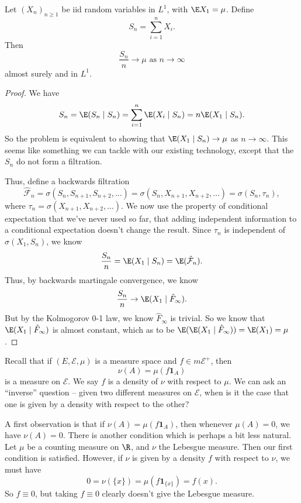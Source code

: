 \documentclass[a4paper]{article}
\begin{document}
\begin{thm}
  Let $(X_n)_{n \geq 1}$ be iid random variables in $L^1$, with $\E X_1 = \mu$. Define
  \[
    S_n = \sum_{i = 1}^n X_i.
  \]
  Then
  \[
    \frac{S_n}{n} \to \mu\text{ as }n \to \infty
  \]
  almost surely and in $L^1$.
\end{thm}

\begin{proof}
  We have
  \[
    S_n = \E(S_n \mid S_n) = \sum_{i = 1}^n \E(X_i \mid S_n) = n \E(X_1 \mid S_n).
  \]
  So the problem is equivalent to showing that $\E(X_1 \mid S_n) \to \mu$ as $n \to \infty$. This seems like something we can tackle with our existing technology, except that the $S_n$ do not form a filtration.

  Thus, define a backwards filtration
  \[
    \hat{\mathcal{F}}_n = \sigma(S_n, S_{n + 1}, S_{n + 2}, \ldots) = \sigma(S_n, X_{n + 1}, X_{n + 2}, \ldots) = \sigma(S_n, \tau_n),
  \]
  where $\tau_n = \sigma(X_{n + 1}, X_{n + 2}, \ldots)$. We now use the property of conditional expectation that we've never used so far, that adding independent information to a conditional expectation doesn't change the result. Since $\tau_n$ is independent of $\sigma(X_1, S_n)$, we know
  \[
    \frac{S_n}{n} = \E(X_1 \mid S_n) = \E(\hat{\mathcal{F}}_n).
  \]
  Thus, by backwards martingale convergence, we know
  \[
    \frac{S_n}{n} \to \E(X_1 \mid \hat{F}_{\infty}).
  \]
  But by the Kolmogorov 0-1 law, we know $\hat{F}_{\infty}$ is trivial. So we know that $\E(X_1 \mid \hat{F}_{\infty})$ is almost constant, which as to be $\E(\E(X_1 \mid \hat{F}_{\infty})) = \E(X_1) = \mu$.
\end{proof}

Recall that if $(E, \mathcal{E}, \mu)$ is a measure space and $f \in m\mathcal{E}^+$, then
\[
  \nu(A) = \mu(f \mathbf{1}_A)
\]
is a measure on $\mathcal{E}$. We say $f$ is a density of $\nu$ with respect to $\mu$.
We can ask an ``inverse'' question -- given two different measures on $\mathcal{E}$, when is it the case that one is given by a density with respect to the other?

A first observation is that if $\nu(A) = \mu(f \mathbf{1}_A)$, then whenever $\mu(A) = 0$, we have $\nu(A) = 0$. There is another condition which is perhaps a bit less natural. Let $\mu$ be a counting measure on $\R$, and $\nu$ the Lebesgue measure. Then our first condition is satisfied. However, if $\nu$ is given by a density $f$ with respect to $\nu$, we must have
\[
  0 = \nu(\{x\}) = \mu(f \mathbf{1}_{\{x\}}) = f(x).
\]
So $f \equiv 0$, but taking $f \equiv 0$ clearly doesn't give the Lebesgue measure.
\end{document}

